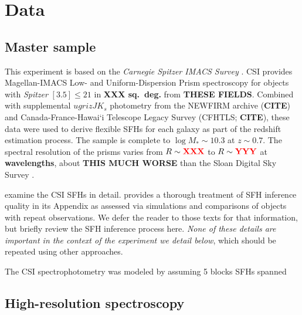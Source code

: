 \documentclass[a4paper,fleqn,usenatbib]{mnras}
\newcommand{\Mstel}{M_\ast}
\newcommand{\bfr}{\bf\color{red}}
\newcommand{\CITE}{{\bfr CITE}}
\begin{document}

\section{Data}
\label{sec:data}

\subsection{Master sample}
\label{sec:master}

This experiment is based on the {\it Carnegie Spitzer IMACS Survey} \citep[CSI;][]{Kelson14a}. CSI provides
Magellan-IMACS Low- and Uniform-Dispersion Prism spectroscopy for objects with {\it Spitzer} 
$[3.5]\leq21$ in {\bfr XXX sq.~deg.} from {\bfr THESE FIELDS}. Combined with supplemental 
$ugrizJK_{s}$ photometry from the NEWFIRM archive (\CITE) and Canada-France-Hawai`i Telescope 
Legacy Survey (CFHTLS; \CITE), these data were used to derive flexible SFHs for each galaxy as part of 
the redshift estimation process. The sample is complete to $\log\Mstel\sim10.3$ at $z\sim0.7$.
The spectral resolution of the prisms varies from $R\sim{\bfr XXX}$ to $R\sim{\bfr YYY}$ at
{\bfr wavelengths}, about {\bfr THIS MUCH WORSE} than the Sloan Digital Sky Survey \citep{York00}.

\citet{Dressler16, Dressler18} examine the CSI SFHs in detail. \citet{Dressler18} provides a thorough treatment 
of SFH inference quality in its Appendix as assessed via simulations and comparisons of objects with repeat 
observations. We defer the reader to those texts for that information, but briefly review the SFH inference 
process here. {\it None of these details are important in the context of the experiment we detail below}, which 
should be repeated using other approaches.

The CSI spectrophotometry was modeled by assuming 5 blocks SFHs spanned 

\subsection{High-resolution spectroscopy}
\label{sec: hiRes}



\end{document}
